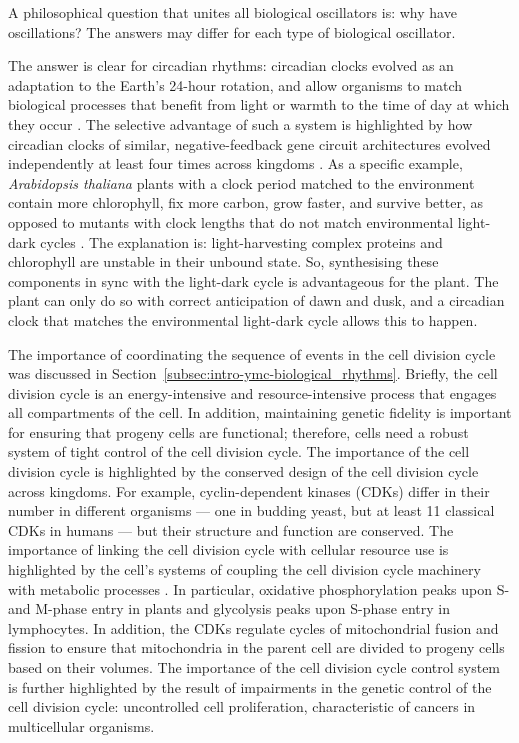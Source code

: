 A philosophical question that unites all biological oscillators is: why have oscillations?
The answers may differ for each type of biological oscillator.

The answer is clear for circadian rhythms: circadian clocks evolved as an adaptation to the Earth's 24-hour rotation, and allow organisms to match biological processes that benefit from light or warmth to the time of day at which they occur \parencite{millarInputSignalsPlant2004}.
The selective advantage of such a system is highlighted by how circadian clocks of similar, negative-feedback gene circuit architectures evolved independently at least four times across kingdoms \parencite{doddPlantCircadianClocks2005}.
As a specific example, \textit{Arabidopsis thaliana} plants with a clock period matched to the environment contain more chlorophyll, fix more carbon, grow faster, and survive better, as opposed to mutants with clock lengths that do not match environmental light-dark cycles \parencite{doddPlantCircadianClocks2005}.
The explanation is: light-harvesting complex proteins and chlorophyll are unstable in their unbound state.
So, synthesising these components in sync with the light-dark cycle is advantageous for the plant.
The plant can only do so with correct anticipation of dawn and dusk, and a circadian clock that matches the environmental light-dark cycle allows this to happen.

The importance of coordinating the sequence of events in the cell division cycle was discussed in Section~\ref{subsec:intro-ymc-biological_rhythms}.
Briefly, the cell division cycle is an energy-intensive and resource-intensive process that engages all compartments of the cell.
In addition, maintaining genetic fidelity is important for ensuring that progeny cells are functional; therefore, cells need a robust system of tight control of the cell division cycle.
The importance of the cell division cycle is highlighted by the conserved design of the cell division cycle across kingdoms.
For example, cyclin-dependent kinases (CDKs) differ in their number in different organisms --- one in budding yeast, but at least 11 classical CDKs in humans \parencite{malumbresCyclindependentKinasesFamily2009} --- but their structure and function are conserved.
The importance of linking the cell division cycle with cellular resource use is highlighted by the cell's systems of coupling the cell division cycle machinery with metabolic processes \parencite{salazar-roaFuelingCellDivision2017}.
In particular, oxidative phosphorylation peaks upon S- and M-phase entry in plants and glycolysis peaks upon S-phase entry in lymphocytes.
In addition, the CDKs regulate cycles of mitochondrial fusion and fission to ensure that mitochondria in the parent cell are divided to progeny cells based on their volumes.
The importance of the cell division cycle control system is further highlighted by the result of impairments in the genetic control of the cell division cycle: uncontrolled cell proliferation, characteristic of cancers in multicellular organisms.

